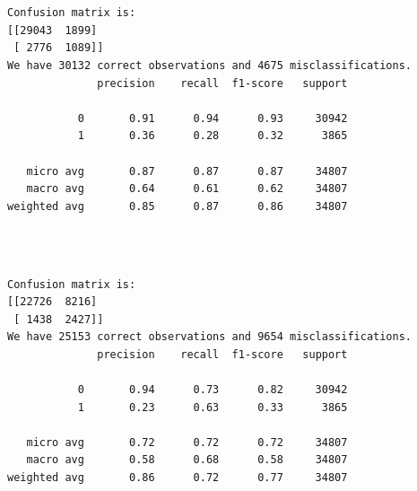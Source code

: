 \documentclass[8pt,onecolumn,aps,pra]{revtex4-1}
\begin{document}
    \begin{center}
    \end{center}
    { \hspace*{\fill} \\}
    
    \begin{center}
    \end{center}
    { \hspace*{\fill} \\}
    
    \begin{Verbatim}[commandchars=\\\{\}]
Confusion matrix is:
[[29043  1899]
 [ 2776  1089]]
We have 30132 correct observations and 4675 misclassifications.
              precision    recall  f1-score   support

           0       0.91      0.94      0.93     30942
           1       0.36      0.28      0.32      3865

   micro avg       0.87      0.87      0.87     34807
   macro avg       0.64      0.61      0.62     34807
weighted avg       0.85      0.87      0.86     34807


    \end{Verbatim}

    \begin{center}
    \end{center}
    { \hspace*{\fill} \\}
    
    \begin{Verbatim}[commandchars=\\\{\}]
Confusion matrix is:
[[22726  8216]
 [ 1438  2427]]
We have 25153 correct observations and 9654 misclassifications.
              precision    recall  f1-score   support

           0       0.94      0.73      0.82     30942
           1       0.23      0.63      0.33      3865

   micro avg       0.72      0.72      0.72     34807
   macro avg       0.58      0.68      0.58     34807
weighted avg       0.86      0.72      0.77     34807


    \end{Verbatim}
\end{document}
